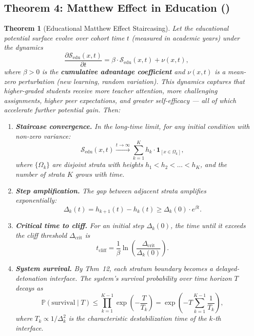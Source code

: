 \documentclass[11pt,a4paper]{article}
\newtheorem{theorem}{Theorem}[section]
\newcommand{\Pbb}{\mathbb{P}}
\newcommand{\cS}{\mathcal{S}}
\newcommand{\ind}[1]{\mathbf{1}_{[#1]}}
\begin{document}
\subsection{Theorem 4: Matthew Effect in Education ()}
\begin{theorem}[Educational Matthew Effect Staircasing]
\label{thm:edu_matthew}
Let the educational potential surface evolve over cohort time $t$ (measured in academic years) under the dynamics
\begin{equation}
    \frac{\partial \cS_{\text{edu}}(x,t)}{\partial t} = \beta \cdot \cS_{\text{edu}}(x,t) + \nu(x,t),
    \label{eq:matthew_dynamics}
\end{equation}
where $\beta > 0$ is the \textbf{cumulative advantage coefficient} and $\nu(x,t)$ is a mean-zero perturbation (new learning, random variation). This dynamics captures that higher-graded students receive more teacher attention, more challenging assignments, higher peer expectations, and greater self-efficacy — all of which accelerate further potential gain. Then:
\begin{enumerate}[label=(\roman*)]
    \item \textbf{Staircase convergence.} In the long-time limit, for any initial condition with non-zero variance:
    \begin{equation}
        \cS_{\text{edu}}(x,t) \xrightarrow{t \to \infty} \sum_{k=1}^{K} h_k \cdot \ind{x \in \Omega_k},
    \end{equation}
    where $\{\Omega_k\}$ are disjoint strata with heights $h_1 < h_2 < \dots < h_K$, and the number of strata $K$ grows with time.
    \item \textbf{Step amplification.} The gap between adjacent strata amplifies exponentially:
    \begin{equation}
        \Delta_k(t) = h_{k+1}(t) - h_k(t) \geq \Delta_k(0) \cdot e^{\beta t}.
    \end{equation}
    \item \textbf{Critical time to cliff.} For an initial step $\Delta_k(0)$, the time until it exceeds the cliff threshold $\Delta_{\text{crit}}$ is
    \begin{equation}
        t_{\text{cliff}} = \frac{1}{\beta} \ln\left(\frac{\Delta_{\text{crit}}}{\Delta_k(0)}\right).
    \end{equation}
    \item \textbf{System survival.} By Thm~12, each stratum boundary becomes a delayed-detonation interface. The system's survival probability over time horizon $T$ decays as
    \begin{equation}
        \Pbb(\text{survival} \mid T) \leq \prod_{k=1}^{K-1} \exp\left(-\frac{T}{T_k}\right) = \exp\left(-T \sum_{k=1}^{K-1} \frac{1}{T_k}\right),
    \end{equation}
    where $T_k \propto 1/\Delta_k^2$ is the characteristic destabilization time of the $k$-th interface.
\end{enumerate}
\end{theorem}
\end{document}
